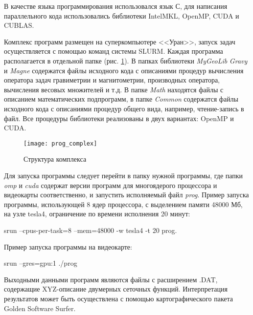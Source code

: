 В качестве языка программирования использовался язык С, для написания параллельного кода использовались библиотеки IntelMKL, OpenMP, CUDA и CUBLAS.

Комплекс программ размещен на суперкомпьютере <<Уран>>, запуск задач осуществляется с помощью команд системы SLURM. Каждая программа  располагается в отдельной папке (рис. \ref{fig:prog_complex}). В папках библиотеки \textit{MyGeoLib} \textit{Gravy} и \textit{Magne} содержатся файлы исходного кода с описаниями процедур вычисления оператора задач гравиметрии и магнитометрии, производных оператора, вычисления весовых множителей и т.д. В папке \textit{Math} находятся файлы с описанием математических подпрограмм, в папке \textit{Common} содержатся файлы исходного кода с описаниями процедур общего вида, например, чтение-запись в файл. Все процедуры библиотеки реализованы в двух вариантах: OpenMP и CUDA. 
\begin{figure}[h]
	\centering
	\texttt{[image: prog\_complex]}
	\caption{Структура комплекса}
	\label{fig:prog_complex}
\end{figure}

Для запуска программы следует перейти в папку нужной программы, где папки \textit{omp} и \textit{cuda} содержат версии программ для многоядерого процессора и видеокарты соответственно, и запустить исполняемый файл \textit{prog}. Пример запуска программы, использующей 8 ядер процессора, с выделением памяти 48000 Мб, на узле tesla4, ограничение по времени исполнения 20 минут:

srun --cpus-per-task=8 --mem=48000 -w tesla4 -t 20 prog.

Пример запуска программы на видеокарте:

srun --gres=gpu:1 ./prog

Выходными данными программ являются файлы с расширением .DAT, содержащие XYZ-описание двумерных сеточных функций. Интерпретация результатов может быть осуществлена с помощью картографического пакета Golden Software Surfer.

